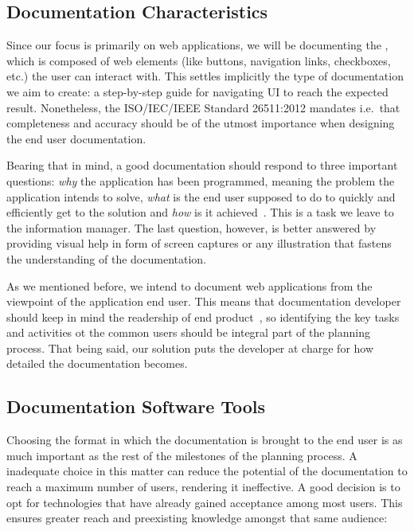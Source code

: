 \subsection{Documentation Characteristics}\label{sec:char}

Since our focus is primarily on web applications, we will be documenting the , which is composed of web elements (like buttons, navigation links, checkboxes, etc.) the user can interact with. This settles implicitly the type of documentation we aim to create: a step-by-step guide for navigating UI to reach the expected result. Nonetheless, the ISO/IEC/IEEE Standard 26511:2012 mandates i.e.~that completeness and accuracy should be of the utmost importance when designing the end user documentation.

Bearing that in mind, a good documentation should respond to three important questions: \textit{why} the application has been programmed, meaning the problem the application intends to solve, \textit{what} is the end user supposed to do to quickly and efficiently get to the solution and \textit{how} is it achieved~\cite{ISO-IEC-IEEE}. This is a task we leave to the information manager. The last question, however, is better answered by providing visual help in form of screen captures or any illustration that fastens the understanding of the documentation. 

As we mentioned before, we intend to document web applications from the viewpoint of the application end user. This means that documentation developer should keep in mind the readership of end product~\cite{ISO-IEC-IEEE}, so identifying the key tasks and activities ot the common users should be integral part of the planning process. That being said, our solution puts the developer at charge for how detailed the documentation becomes.

\subsection{Documentation Software Tools}

Choosing the format in which the documentation is brought to the end user is as much important as the rest of the milestones of the planning process. A inadequate choice in this matter can reduce the potential of the documentation to reach a maximum number of users, rendering it ineffective. A good decision is to opt for technologies that have already gained acceptance among most users. This ensures greater reach and preexisting knowledge amongst that same audience:

